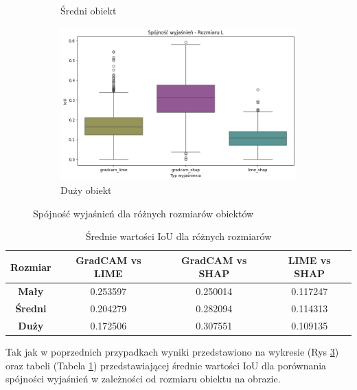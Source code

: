 \begin{figure}[h]
\begin{subfigure}[b]{0.3\textwidth}
		\caption{Średni obiekt}  \label{}
	\end{subfigure}
	\begin{subfigure}[b]{0.3\textwidth}
		\centering\includegraphics[width=1\textwidth]{img/base_coherence_size_L}
		\caption{Duży obiekt}  \label{}
	\end{subfigure}
	\caption{Spójność wyjaśnień dla różnych rozmiarów obiektów}
	\label{rys:coherence_size}
\end{figure}

\begin{table}[h]
	\centering
	\begin{tabular}{|c|c|c|c|}
		\hline
		\textbf{Rozmiar} & \textbf{GradCAM vs LIME} & \textbf{GradCAM vs SHAP} & \textbf{LIME vs SHAP} \\
		\hline
		\textbf{Mały}    & 0.253597                 & 0.250014                 & 0.117247              \\
		\hline
		\textbf{Średni}  & 0.204279                 & 0.282094                 & 0.114313              \\
		\hline
		\textbf{Duży}    & 0.172506                 & 0.307551                 & 0.109135              \\
		\hline
	\end{tabular}
	\caption{Średnie wartości IoU dla różnych rozmiarów}
	\label{tab:base_coherence_size}
\end{table}

Tak jak w poprzednich przypadkach wyniki przedstawiono na wykresie (Rys \ref{rys:coherence_size}) oraz tabeli (Tabela \ref{tab:base_coherence_size}) przedstawiającej średnie wartości IoU dla porównania spójności wyjaśnień w zależności od rozmiaru obiektu na obrazie.

